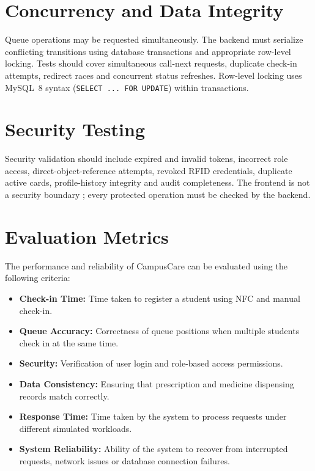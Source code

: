 \documentclass[a4paper,oneside,openany]{tietreport}
\begin{document}
\section{Concurrency and Data Integrity}
Queue operations may be requested simultaneously. The backend must serialize conflicting transitions using database transactions and appropriate row-level locking. Tests should cover simultaneous call-next requests, duplicate check-in attempts, redirect races and concurrent status refreshes. Row-level locking uses MySQL~8 syntax (\texttt{SELECT ... FOR UPDATE}) within transactions.

\section{Security Testing}
Security validation should include expired and invalid tokens, incorrect role access, direct-object-reference attempts, revoked RFID credentials, duplicate active cards, profile-history integrity and audit completeness. The frontend is not a security boundary \cite{owasp}; every protected operation must be checked by the backend.

\section{Evaluation Metrics}

The performance and reliability of CampusCare can be
evaluated using the following criteria:

\begin{itemize}

    \item \textbf{Check-in Time:}
    Time taken to register a student using NFC and
    manual check-in.

    \item \textbf{Queue Accuracy:}
    Correctness of queue positions when multiple
    students check in at the same time.

    \item \textbf{Security:}
    Verification of user login and role-based
    access permissions.

    \item \textbf{Data Consistency:}
    Ensuring that prescription and medicine
    dispensing records match correctly.

    \item \textbf{Response Time:}
    Time taken by the system to process requests
    under different simulated workloads.

    \item \textbf{System Reliability:}
    Ability of the system to recover from interrupted
    requests, network issues or database connection
    failures.

\end{itemize}
\end{document}
